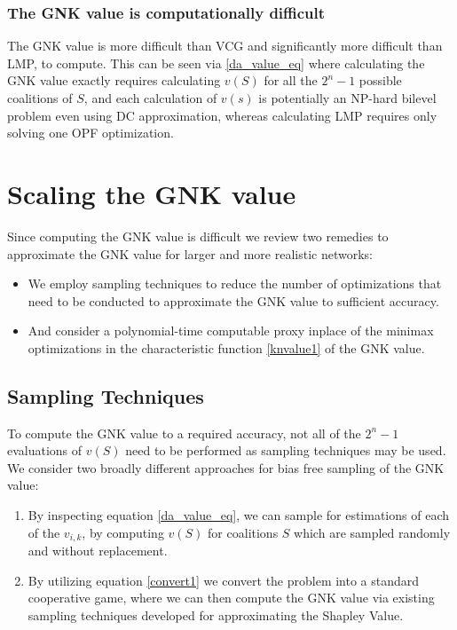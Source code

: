 \subsubsection*{The GNK value is computationally difficult}
The GNK value is more difficult than VCG and significantly more difficult than LMP, to compute.
This can be seen via \eqref{da_value_eq} where calculating the GNK value exactly requires calculating $v(S)$ for all the $2^n-1$ possible coalitions of $S$, and each calculation of $v(s)$ is potentially an NP-hard bilevel problem even using DC approximation, whereas calculating LMP requires only solving one OPF optimization.


\section{Scaling the GNK value}\label{sec:scaling}

Since computing the GNK value is difficult we review two remedies to approximate the GNK value for larger and more realistic networks:

\begin{itemize}
    \item We employ sampling techniques to reduce the number of optimizations that need to be conducted to approximate the GNK value to sufficient accuracy.
    \item And consider a polynomial-time computable proxy inplace of the minimax optimizations in the characteristic function \eqref{knvalue1} of the GNK value.
\end{itemize}

\subsection{Sampling Techniques}\label{sec:sampling_techniques}
To compute the GNK value to a required accuracy, not all of the $2^n-1$ evaluations of $v(S)$ need to be performed as sampling techniques may be used.
We consider two broadly different approaches for bias free sampling of the GNK value:
\begin{enumerate}
    \item By inspecting equation \ref{da_value_eq}, we can sample for estimations of each of the $v_{i,k}$, by computing $v(S)$ for coalitions $S$ which are sampled randomly and without replacement.
    \item By utilizing equation \ref{convert1} we convert the problem into a standard cooperative game, where we can then compute the GNK value via existing sampling techniques developed for approximating the Shapley Value.
\end{enumerate}


